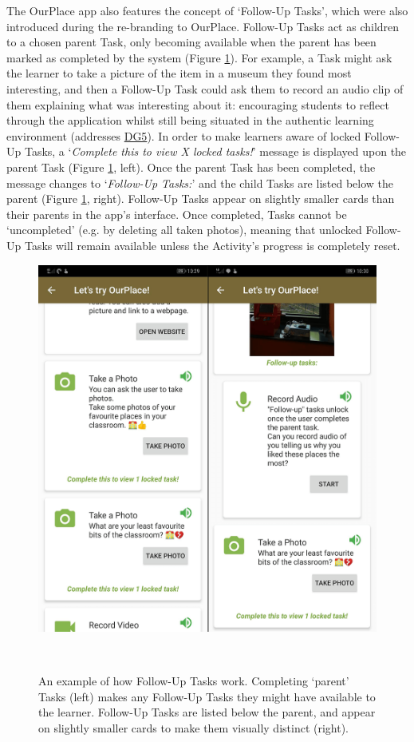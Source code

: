 The OurPlace app also features the concept of `Follow-Up Tasks', which were also introduced during the re-branding to OurPlace. Follow-Up Tasks act as children to a chosen parent Task, only becoming available when the parent has been marked as completed by the system (Figure \ref{fig:FollowUpTasks}). For example, a Task might ask the learner to take a picture of the item in a museum they found most interesting, and then a Follow-Up Task could ask them to record an audio clip of them explaining what was interesting about it: encouraging students to reflect through the application whilst still being situated in the authentic learning environment (addresses \hyperref[DG5]{DG5}). In order to make learners aware of locked Follow-Up Tasks, a `\textit{Complete this to view X locked tasks!}' message is displayed upon the parent Task (Figure \ref{fig:FollowUpTasks}, left). Once the parent Task has been completed, the message changes to `\textit{Follow-Up Tasks:}' and the child Tasks are listed below the parent (Figure \ref{fig:FollowUpTasks}, right). Follow-Up Tasks appear on slightly smaller cards than their parents in the app's interface. Once completed, Tasks cannot be `uncompleted' (e.g. by deleting all taken photos), meaning that unlocked Follow-Up Tasks will remain available unless the Activity's progress is completely reset.

\begin{figure}
  \centering
  \includegraphics[width=0.6\columnwidth]{images/chapter05/FollowUpTasks.png}
  \caption[Follow-Up Task example]{An example of how Follow-Up Tasks work. Completing `parent' Tasks (left) makes any Follow-Up Tasks they might have available to the learner. Follow-Up Tasks are listed below the parent, and appear on slightly smaller cards to make them visually distinct (right). }~\label{fig:FollowUpTasks}
\end{figure}

